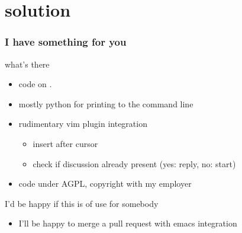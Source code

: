\section{solution}
\begin{frame}
  \frametitle{I have something for you}
  \begin{block}{what's there}
    \begin{itemize}
      \item code on .
      \item mostly python for printing to the command line
      \item rudimentary vim plugin integration
        \begin{itemize}
          \item insert after cursor
          \item check if discussion already present (yes: reply, no: start)
        \end{itemize}
      \item code under AGPL, copyright with my employer
    \end{itemize}
  \end{block}
  \begin{exampleblock}{I'd be happy if this is of use for somebody}
    \begin{itemize}
      \item I'll be happy to merge a pull request with emacs integration
    \end{itemize}
  \end{exampleblock}
\end{frame}
